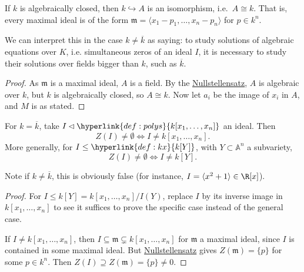 \documentclass{article}
\newcommand{\A}{\mathbb{A}}
\begin{document}
\color{gray}
\begin{cor}
    If $k$ is algebraically closed, then $k \hookrightarrow A$ is an isomorphism, i.e.\ $A \cong k$.
    That is, every maximal ideal is of the form $\mathfrak{m}= \langle x_1 - p_1, \dotsc, x_n - p_n \rangle$ for $p \in k^n$.
\end{cor}

We can interpret this in the case $k \neq \overline{k}$ as saying: to study solutions of algebraic equations over $K$, i.e. simultaneous zeros of an ideal $I$, it is necessary to study their solutions over fields bigger than $k$, such as $\overline{k}$.
\begin{proof}
    As $\mathfrak{m}$ is a maximal ideal, $A$ is a field. By the \hyperlink{def:null1}{Nullstellensatz}, $A$ is algebraic over $k$, but $k$ is algebraically closed, so $A \cong k$.
    Now let $a_i$ be the image of $x_i$ in $A$, and $M$ is as stated.
\end{proof}

%
\color{black}
\begin{cor}
    For $k = \overline{k}$, take $I \lhd \hyperlink{def:polys}{k[x_1, \dotsc, x_n]}$ an ideal.
    Then \begin{equation*}Z(I) \neq \emptyset \iff I \neq k[x_1, \dotsc, x_n].\end{equation*}
    More generally, for $I \leq \hyperlink{def:kx}{k[Y]}$, with $Y \subset \A^n$ a subvariety, \begin{equation*}Z(I) \neq \emptyset \iff I \neq k[Y].\end{equation*}
\end{cor}
Note if $k \neq \overline{k}$, this is obviously false (for instance, $I=\langle x^2 + 1 \rangle \in \R[x]$).

\begin{proof}
    For $I \leq k[Y] = k[x_1, \dotsc, x_n]/I(Y)$, replace $I$ by its inverse image in $k[x_1, \dotsc, x_n]$ to see it suffices to prove the specific case instead of the general case.

    If $I \neq k[x_1, \dotsc, x_n]$, then $I \subseteq \mathfrak{m} \subsetneq k[x_1, \dotsc, x_n]$ for $\mathfrak{m}$ a maximal ideal, since $I$ is contained in some maximal ideal.
    But \hyperlink{def:null1}{Nullstellensatz} gives $Z(\mathfrak{m}) = \{p\}$ for some $p \in k^n$.
    Then $Z(I) \supseteq Z(\mathfrak{m}) = \{p\} \neq 0$.
\end{proof}
\end{document}
